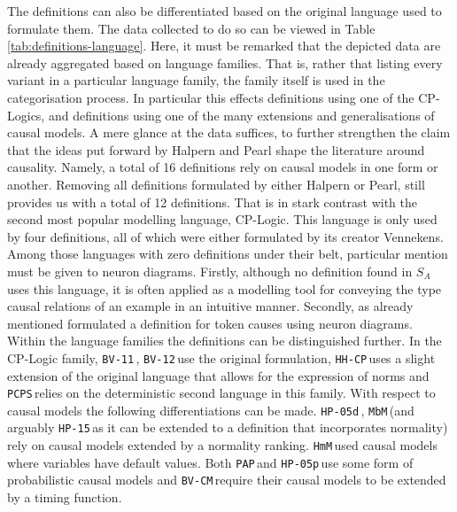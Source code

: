 \documentclass[11pt,a4paper]{book}
\theoremstyle{definition}
\theoremstyle{definition}
\theoremstyle{definition}
\theoremstyle{remark}
\newcommand{\prset}{S_{A}}
\newcommand{\hpud}{\texttt{HP-05d}\,}
\newcommand{\pap}{\texttt{PAP}\,}
\newcommand{\bvo}{\texttt{BV-11}\,}
\newcommand{\bvu}{\texttt{BV-12}\,}
\newcommand{\hpm}{\texttt{HP-15}\,}
\newcommand{\hhcp}{\texttt{HH-CP}\,}
\newcommand{\hpup}{\texttt{HP-05p}\,}
\newcommand{\hmm}{\texttt{HmM}\,}
\newcommand{\mbm}{\texttt{MbM}\,}
\newcommand{\bvcm}{\texttt{BV-CM}\,}
\newcommand{\pcps}{\texttt{PCPS}\,}
\begin{document}
\clearpage


The definitions can also be differentiated based on the original language used to formulate them.
The data collected to do so can be viewed in Table \ref{tab:definitions-language}. Here, it must be remarked that 
the depicted data are already aggregated based on language families. That is, rather that listing every variant in a particular language family, the family itself is used in the categorisation process.
In particular this effects definitions using one of the CP-Logics, and definitions using one of the many extensions and generalisations of causal models.
A mere glance at the data suffices, to further strengthen the claim that the ideas put forward by Halpern and Pearl shape the literature around causality.
Namely, a total of 16 definitions rely on causal models in one form or another. Removing all definitions formulated by either Halpern or Pearl, still provides us with a total of 12 definitions.
That is in stark contrast with the second most popular modelling language, CP-Logic. This language is only used by four definitions, all of which were either formulated by its creator Vennekens.
Among those languages with zero definitions under their belt, particular mention must be given to neuron diagrams. Firstly, although no definition found in $\prset$ uses this language, it is often applied as a modelling tool for conveying the type causal relations of an example in an intuitive manner. Secondly, as already mentioned \parencite{erwig2010causal} formulated a definition for token causes using neuron diagrams.  Within the language families the definitions can be distinguished further. In the CP-Logic family, \bvo, \bvu use the original formulation, \hhcp uses a slight extension of the original language that allows for the expression of norms and \pcps relies on the deterministic second language in this family.
With respect to causal models the following differentiations can be made. \hpud, \mbm (and arguably \hpm as it can be extended to a definition that incorporates normality) rely on causal models extended by a normality ranking. \hmm used causal models where variables have default values. Both \pap and \hpup use some form of probabilistic causal models and \bvcm require their causal models to be extended by a timing function.
\end{document}
